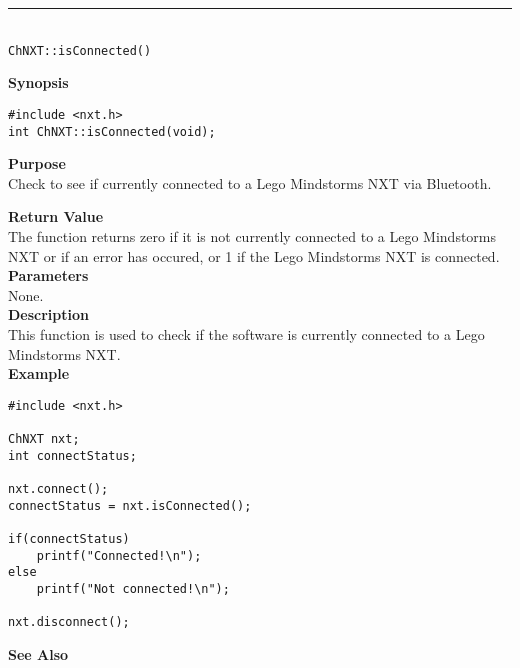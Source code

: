 \noindent
\vspace{5pt}
\rule{4.5in}{0.015in}\\
\noindent
{\LARGE \texttt{ChNXT::isConnected()} }\\


\noindent
{\bf Synopsis}
\vspace{-8pt}
\begin{verbatim}
#include <nxt.h>
int ChNXT::isConnected(void);
\end{verbatim}

\noindent
{\bf Purpose}\\
Check to see if currently connected to a Lego Mindstorms NXT via Bluetooth.

\noindent
{\bf Return Value}\\
The function returns zero if it is not currently connected to a Lego Mindstorms NXT or if an error has occured, or 1 if the Lego Mindstorms NXT is connected.\\

\noindent
{\bf Parameters}\\
None.\\

\noindent
{\bf Description}\\
This function is used to check if the software is currently connected to a Lego Mindstorms NXT.\\

\noindent
{\bf Example}
\begin{verbatim}
#include <nxt.h>

ChNXT nxt;
int connectStatus;

nxt.connect();
connectStatus = nxt.isConnected();

if(connectStatus)
    printf("Connected!\n");
else
    printf("Not connected!\n");

nxt.disconnect();
\end{verbatim}

\noindent
{\bf See Also}\\
